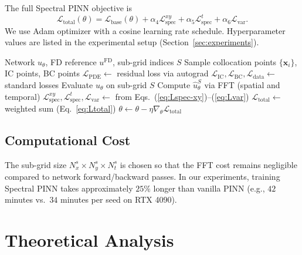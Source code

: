 \documentclass[times,12pt]{elsarticle}
\begin{document}
The full Spectral PINN objective is
\begin{equation}
\mathcal{L}_{\text{total}}(\theta) = \mathcal{L}_{\text{base}}(\theta) + \alpha_4 \mathcal{L}_{\text{spec}}^{xy} + \alpha_5 \mathcal{L}_{\text{spec}}^{t} + \alpha_6 \mathcal{L}_{\text{var}}.
\label{eq:Ltotal}
\end{equation}
We use Adam optimizer with a cosine learning rate schedule. Hyperparameter values are listed in the experimental setup (Section~\ref{sec:experiments}).


\begin{algorithm}[t]
\caption{Spectral PINN Training (one epoch)}
\label{alg:training}
\begin{algorithmic}[1]
\Require Network $u_\theta$, FD reference $u^{\text{FD}}$, sub-grid indices $S$
\State Sample collocation points $\{\mathbf{x}_i\}$, IC points, BC points
\State $\mathcal{L}_{\text{PDE}} \gets$ residual loss via autograd
\State $\mathcal{L}_{\text{IC}}, \mathcal{L}_{\text{BC}}, \mathcal{L}_{\text{data}} \gets$ standard losses
\State Evaluate $u_\theta$ on sub-grid $S$
\State Compute $\hat{u}_\theta^S$ via FFT (spatial and temporal)
\State $\mathcal{L}_{\text{spec}}^{xy}, \mathcal{L}_{\text{spec}}^{t}, \mathcal{L}_{\text{var}} \gets$ from Eqs.~(\ref{eq:Lspec-xy})--(\ref{eq:Lvar})
\State $\mathcal{L}_{\text{total}} \gets$ weighted sum (Eq.~\ref{eq:Ltotal})
\State $\theta \gets \theta - \eta \nabla_\theta \mathcal{L}_{\text{total}}$
\end{algorithmic}
\end{algorithm}

\subsection{Computational Cost}

The sub-grid size $N_x^s \times N_y^s \times N_t^s$ is chosen so that the FFT cost remains negligible compared to network forward/backward passes. In our experiments, training Spectral PINN takes approximately $25\%$ longer than vanilla PINN (e.g., $42$ minutes vs.\ $34$ minutes per seed on RTX 4090).


\section{Theoretical Analysis}
\label{sec:theory}
\end{document}
